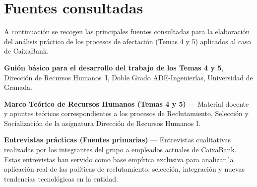 
\chapter*{Fuentes consultadas}

A continuación se recogen las principales fuentes consultadas para la
elaboración del análisis práctico de los procesos de afectación (Temas 4 y 5) 
aplicados al caso de CaixaBank.

\begin{enumerate}[label={[\arabic*]}]

  \item \textbf{Guión básico para el desarrollo del trabajo de los Temas 4 y 5},
        Dirección de Recursos Humanos~I, Doble Grado ADE-Ingenierías,
        Universidad de Granada.

  \item \textbf{Marco Teórico de Recursos Humanos (Temas 4 y 5)} --- 
        Material docente y apuntes teóricos correspondientes a los procesos de 
        Reclutamiento, Selección y Socialización de la asignatura Dirección 
        de Recursos Humanos I.

  \item \textbf{Entrevistas prácticas (Fuentes primarias)} --- 
        Entrevistas cualitativas realizadas por los integrantes del grupo 
        a empleados actuales de CaixaBank. Estas entrevistas han servido como base 
        empírica exclusiva para analizar la aplicación real de las políticas de 
        reclutamiento, selección, integración y nuevas tendencias tecnológicas en la entidad.

\end{enumerate}

\endinput